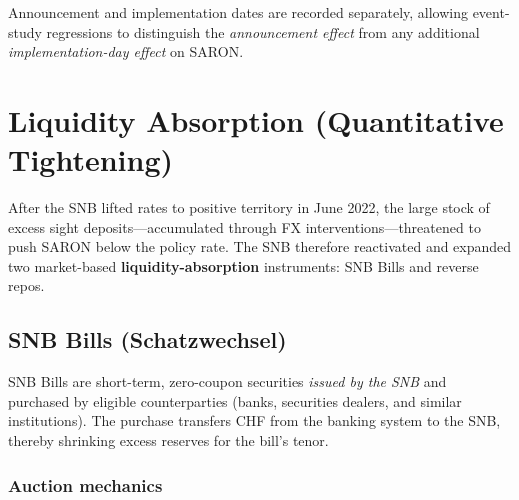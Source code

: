 \documentclass[12pt,a4paper]{article}
\begin{document}
\medskip
\noindent Announcement and implementation dates are recorded separately, allowing
event-study regressions to distinguish the \emph{announcement effect} from any
additional \emph{implementation-day effect} on SARON.

\section{Liquidity Absorption (Quantitative Tightening)}

After the SNB lifted rates to positive territory in June 2022, the large stock
of excess sight deposits---accumulated through FX interventions---threatened to
push SARON below the policy rate.  The SNB therefore reactivated and expanded
two market-based \textbf{liquidity-absorption} instruments: SNB Bills and
reverse repos.

\subsection{SNB Bills (Schatzwechsel)}

SNB Bills are short-term, zero-coupon securities \emph{issued by the SNB}
and purchased by eligible counterparties (banks, securities dealers, and similar
institutions).  The purchase transfers CHF from the banking system to the SNB,
thereby shrinking excess reserves for the bill's tenor.

\subsubsection{Auction mechanics}
\end{document}
